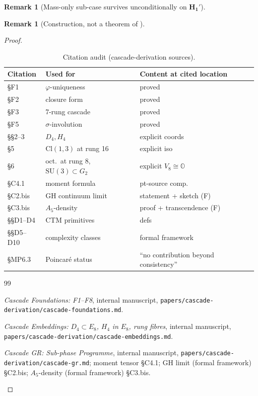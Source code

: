 \documentclass[11pt, a4paper]{amsart}
\theoremstyle{definition}
\newtheorem{remark}[theorem]{Remark}
\newcommand{\OO}{\mathbb{O}}
\newcommand{\pphi}{\varphi}
\begin{document}
\begin{remark}[Mass-only sub-case survives unconditionally on $\mathbf{H_1'}$]
\begin{remark}[Construction, not a theorem of \cite{CascadeEmbeddings}]
\begin{proof}
\begin{table}[h]
\caption{Citation audit (cascade-derivation sources).}
\label{tab:audit-citations}
\begin{tabular}{lll}
\hline
Citation & Used for & Content at cited location \\
\hline
\cite{CascadeFoundations} \S F1 & $\pphi$-uniqueness & proved \\
\cite{CascadeFoundations} \S F2 & closure form & proved \\
\cite{CascadeFoundations} \S F3 & 7-rung cascade & proved \\
\cite{CascadeFoundations} \S F5 & $\sigma$-involution & proved \\
\cite{CascadeEmbeddings} \S\S 2--3 & $D_4, H_4$ & explicit coords \\
\cite{CascadeEmbeddings} \S 5 & $\mathrm{Cl}(1,3)$ at rung 16 & explicit iso \\
\cite{CascadeEmbeddings} \S 6 & oct.\ at rung 8, $\mathrm{SU}(3) \subset G_2$ & explicit $V_8 \cong \OO$ \\
\cite{CascadeGR} \S C4.1 & moment formula & pt-source comp.\ \\
\cite{CascadeGR} \S C2.bis & GH continuum limit & statement + sketch (F) \\
\cite{CascadeGR} \S C3.bis & $A_5$-density & proof + transcendence (F) \\
\cite{CascadeDynamics} \S\S D1--D4 & CTM primitives & defs \\
\cite{CascadeDynamics} \S\S D5--D10 & complexity classes & formal framework \\
\cite{CascadeMillennium} \S MP6.3 & Poincar\'e status & ``no contribution beyond consistency'' \\
\hline
\end{tabular}
\end{table}

\begin{thebibliography}{99}

\emph{Cascade Foundations: F1--F8}, internal manuscript,
  \texttt{papers/cascade-derivation/cascade-foundations.md}.

\emph{Cascade Embeddings: $D_4 \subset E_8$, $H_4$ in $E_8$, rung
  fibres}, internal manuscript,
  \texttt{papers/cascade-derivation/cascade-embeddings.md}.

\emph{Cascade GR: Sub-phase Programme}, internal manuscript,
  \texttt{papers/cascade-derivation/cascade-gr.md}; moment tensor
  \S C4.1; GH limit (formal framework) \S C2.bis; $A_5$-density
  (formal framework) \S C3.bis.


\end{thebibliography}
\end{proof}
\end{remark}
\end{remark}
\end{document}
